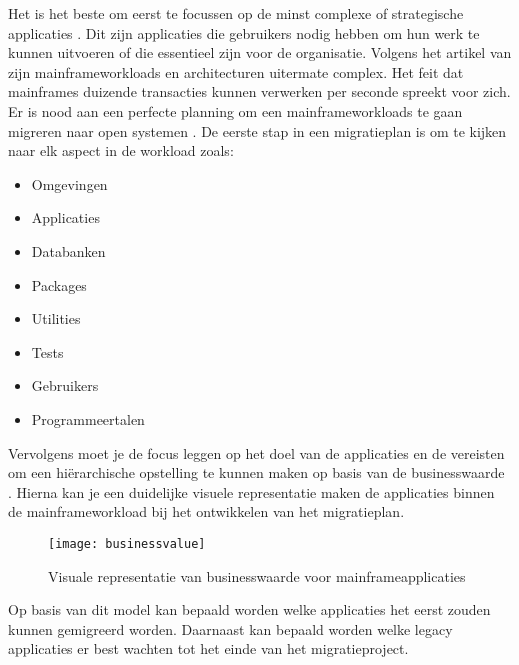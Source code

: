Het is het beste om eerst te focussen op de minst complexe of strategische applicaties \autocite{Korzenlowski2017}. Dit zijn applicaties die gebruikers nodig hebben om hun werk te kunnen uitvoeren of die essentieel zijn voor de organisatie. Volgens het artikel van \citeauthor{Marble2017} zijn mainframeworkloads en architecturen uitermate complex. Het feit dat mainframes duizende transacties kunnen verwerken per seconde spreekt voor zich. Er is nood aan een perfecte planning om een mainframeworkloads te gaan migreren naar open systemen \autocite{Marble2017}. De eerste stap in een migratieplan is om te kijken naar elk aspect in de workload zoals: 
    \begin{itemize}
        \item Omgevingen
        \item Applicaties
        \item Databanken
        \item Packages
        \item Utilities
        \item Tests
        \item Gebruikers
        \item Programmeertalen
    \end{itemize}
Vervolgens moet je de focus leggen op het doel van de applicaties en de vereisten om een hiërarchische opstelling te kunnen maken op basis van de businesswaarde \autocite{Marble2017}. Hierna kan je een duidelijke visuele representatie maken  de applicaties binnen de mainframeworkload bij het ontwikkelen van het migratieplan. 
\begin{figure}
\texttt{[image: businessvalue]}
\caption{Visuale representatie van businesswaarde voor mainframeapplicaties \autocite{Marble2017}}
\end{figure}

Op basis van dit model kan bepaald worden welke applicaties het eerst zouden kunnen gemigreerd worden. Daarnaast kan bepaald worden welke legacy applicaties er best wachten tot het einde van het migratieproject. 

\subsection{}
\label{sec:Workloads migreren naar de cloud}

